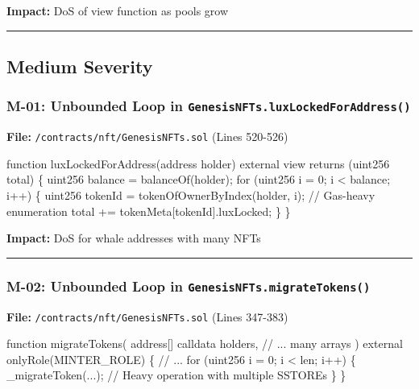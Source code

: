 \documentclass[
]{article}
\newenvironment{Shaded}{}{}
\newcommand{\NormalTok}[1]{#1}
\begin{document}
\textbf{Impact:} DoS of view function as pools grow

\begin{center}\rule{0.5\linewidth}{0.5pt}\end{center}

\subsection{Medium Severity}\label{medium-severity}

\subsubsection{\texorpdfstring{M-01: Unbounded Loop in
\texttt{GenesisNFTs.luxLockedForAddress()}}{M-01: Unbounded Loop in GenesisNFTs.luxLockedForAddress()}}\label{m-01-unbounded-loop-in-genesisnftsluxlockedforaddress}

\textbf{File:} \texttt{/contracts/nft/GenesisNFTs.sol} (Lines 520-526)

\begin{Shaded}
\begin{Highlighting}[]
\NormalTok{function luxLockedForAddress(address holder) external view returns (uint256 total) \{}
\NormalTok{    uint256 balance = balanceOf(holder);}
\NormalTok{    for (uint256 i = 0; i \textless{} balance; i++) \{}
\NormalTok{        uint256 tokenId = tokenOfOwnerByIndex(holder, i);  // Gas{-}heavy enumeration}
\NormalTok{        total += tokenMeta[tokenId].luxLocked;}
\NormalTok{    \}}
\NormalTok{\}}
\end{Highlighting}
\end{Shaded}

\textbf{Impact:} DoS for whale addresses with many NFTs

\begin{center}\rule{0.5\linewidth}{0.5pt}\end{center}

\subsubsection{\texorpdfstring{M-02: Unbounded Loop in
\texttt{GenesisNFTs.migrateTokens()}}{M-02: Unbounded Loop in GenesisNFTs.migrateTokens()}}\label{m-02-unbounded-loop-in-genesisnftsmigratetokens}

\textbf{File:} \texttt{/contracts/nft/GenesisNFTs.sol} (Lines 347-383)

\begin{Shaded}
\begin{Highlighting}[]
\NormalTok{function migrateTokens(}
\NormalTok{    address[] calldata holders,}
\NormalTok{    // ... many arrays}
\NormalTok{) external onlyRole(MINTER\_ROLE) \{}
\NormalTok{    // ...}
\NormalTok{    for (uint256 i = 0; i \textless{} len; i++) \{}
\NormalTok{        \_migrateToken(...);  // Heavy operation with multiple SSTOREs}
\NormalTok{    \}}
\NormalTok{\}}
\end{Highlighting}
\end{Shaded}
\end{document}
